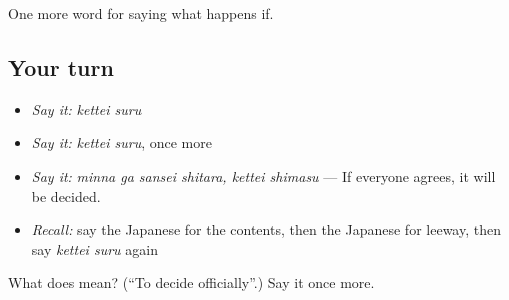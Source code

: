 \begin{grammarlens}[title={What you've built}]
One more word for saying what happens if.
\end{grammarlens}

\subsection*{Your turn}
\begin{itemize}
\raggedright
  \item \emph{Say it:} \emph{kettei suru}
  \item \emph{Say it:} \emph{kettei suru}, once more
  \item \emph{Say it:} \emph{minna ga sansei shitara, kettei shimasu} — If everyone agrees, it will be decided.
  \item \emph{Recall:} say the Japanese for the contents, then the Japanese for leeway, then say \emph{kettei suru} again
\end{itemize}

\begin{tcolorbox}[breakable,colback=teal!4,colframe=teal!35!black,title={Before you move on}]
What does  mean? (\textquotedblleft{}To decide officially\textquotedblright{}.) Say it once more.
\end{tcolorbox}
